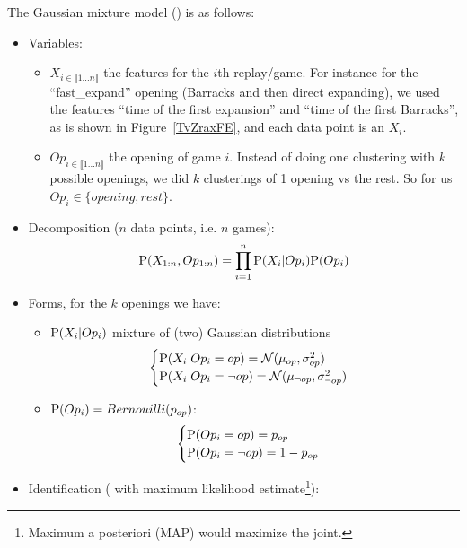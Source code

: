\label{GMMEM}
The Gaussian mixture model () is as follows:
\begin{itemize}
    \item Variables:
    \begin{itemize}
        \item $X_{i \in \llbracket 1 \dots n\rrbracket}$ the features for the $i$th replay/game. For instance for the ``fast\_expand'' opening (Barracks and then direct expanding), we used the features ``time of the first expansion'' and ``time of the first Barracks'', as is shown in Figure~\ref{TvZraxFE}, and each data point is an $X_i$.
        \item $Op_{i \in \llbracket1 \dots n\rrbracket}$ the opening of game $i$. Instead of doing one clustering with $k$ possible openings, we did $k$ clusterings of 1 opening vs the rest. So for us $Op_i \in \{opening, rest\}$.
    \end{itemize}
    \item Decomposition ($n$ data points, i.e. $n$ games):
$$\mathrm{P}(X_{1:n}, Op_{1:n}) = \prod_{i=1}^n \mathrm{P}(X_i|Op_i)\mathrm{P}(Op_i)$$
    \item Forms, for the $k$ openings we have:
    \begin{itemize}
        \item $\mathrm{P}(X_i|Op_i)$ mixture of (two) Gaussian distributions
        \begin{eqnarray*}
            \begin{cases} \mathrm{P}(X_i|Op_i=op) = \mathcal{N}(\mu_{op}, \sigma_{op}^2)\\
            \mathrm{P}(X_i|Op_i=\neg op) = \mathcal{N}(\mu_{\neg op}, \sigma_{\neg op}^2) \end{cases} 
        \end{eqnarray*}
        \item $\mathrm{P}(Op_i) = Bernouilli(p_{op})$: 
        \begin{eqnarray*}
            \begin{cases} \mathrm{P}(Op_i=op) = p_{op}\\
            \mathrm{P}(Op_i=\neg op) = 1-p_{op} \end{cases}
        \end{eqnarray*}
    \end{itemize}
    \item Identification ( with maximum likelihood estimate\footnote{Maximum a posteriori (MAP) would maximize the joint.}):\\

\end{itemize}
